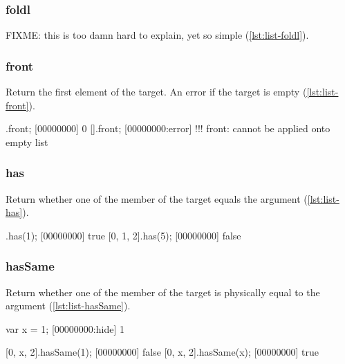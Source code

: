 
\subsubsection{foldl}

FIXME: this is too damn hard to explain, yet so simple
(\autoref{lst:list-foldl}).

\begin{urbiscript}[caption=List.foldl, label=lst:list-foldl]

\end{urbiscript}

\subsubsection{front}
\label{sec:std-list-front}

Return the first element of the target. An error if the target is
empty (\autoref{lst:list-front}).

\begin{urbiscript}[caption=List.front, label=lst:list-front]
[0, 1, 2].front;
[00000000] 0
[].front;
[00000000:error] !!! front: cannot be applied onto empty list
\end{urbiscript}

\subsubsection{has}

Return whether one of the member of the target equals the argument
(\autoref{lst:list-has}).

\begin{urbiscript}[caption=List.has, label=lst:list-has]
[0, 1, 2].has(1);
[00000000] true
[0, 1, 2].has(5);
[00000000] false
\end{urbiscript}

\subsubsection{hasSame}

Return whether one of the member of the target is physically equal to
the argument (\autoref{lst:list-hasSame}).

\begin{urbiscript}[caption=List.hasSame, label=lst:list-hasSame]
var x = 1;
[00000000:hide] 1

[0, x, 2].hasSame(1);
[00000000] false
[0, x, 2].hasSame(x);
[00000000] true
\end{urbiscript}

